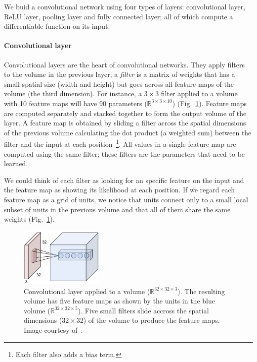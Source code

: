 We buid a convolutional network using four types of layers: convolutional layer, ReLU layer, pooling layer and fully connected layer; all of which compute a differentiable function on its input.

\paragraph{Convolutional layer} Convolutional layers are the heart of convolutional networks. They apply filters to the volume in the previous layer; a \emph{filter} is a matrix of weights that has a small spatial size (width and height) but goes across all feature maps of the volume (the third dimension). For instance, a $3\times 3$ filter applied to a volume with 10 feature maps will have 90 parameters ($\mathbb{R}^{3\times3\times10}$) (Fig.~\ref{fig:ConvLayer}).
Feature maps are computed separately and stacked together to form the output volume of the layer. A feature map is obtained by sliding a filter across the spatial dimensions of the previous volume calculating the dot product (a weighted sum) between the filter and the input at each position~\footnote{Each filter also adds a bias term.}.
All values in a single feature map are computed using the same filter; these filters are the parameters that need to be learned.

We could think of each filter as looking for an specific feature on the input and the feature map as showing its likelihood at each position. If we regard each feature map as a grid of units, we notice that units connect only to a small local subset of units in the previous volume and that all of them share the same weights (Fig.~\ref{fig:ConvLayer}).
\begin{figure}[h]
	\centering
	\includegraphics[width = 0.36\textwidth]{plots/convLayer.jpeg}
	\caption[Convolutional layer applied to a volume]{Convolutional layer applied to a volume ($\mathbb{R}^{32\times 32\times 3}$). The resulting volume has five feature maps as shown by the units in the blue volume ($\mathbb{R}^{32\times 32\times 5}$). Five small filters slide accross the spatial dimensions ($32\times 32$) of the volume to produce the feature maps. Image courtesy of~\cite{Karpathy2015}.}
	\label{fig:ConvLayer}
\end{figure}

